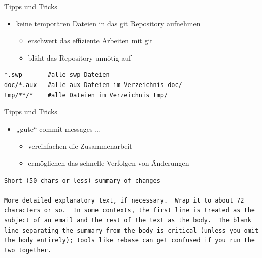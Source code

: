 \begin{frame}[fragile]{Tipps und Tricks}
  \begin{itemize}
    \item keine temporären Dateien in das git Repository aufnehmen
    \begin{itemize}
      \item erschwert das effiziente Arbeiten mit git
      \item bläht das Repository unnötig auf
    \end{itemize}
  \end{itemize}
  \lstset{frame=single}
  \begin{lstlisting}[caption=Inhalt der Datei .gitignore]
*.swp       #alle swp Dateien
doc/*.aux   #alle aux Dateien im Verzeichnis doc/
tmp/**/*    #alle Dateien im Verzeichnis tmp/
  \end{lstlisting}
\end{frame}

\begin{frame}[fragile]{Tipps und Tricks}
  \begin{itemize}
    \item „gute“ commit messages \ldots
    \begin{itemize}
      \item vereinfachen die Zusammenarbeit
      \item ermöglichen das schnelle Verfolgen von Änderungen
    \end{itemize}
  \end{itemize}
  \begin{lstlisting}[frame=single,caption={Quelle: \url{http://tbaggery.com/2008/04/19/a-note-about-git-commit-messages.html}}]
Short (50 chars or less) summary of changes

More detailed explanatory text, if necessary.  Wrap it to about 72
characters or so.  In some contexts, the first line is treated as the
subject of an email and the rest of the text as the body.  The blank
line separating the summary from the body is critical (unless you omit
the body entirely); tools like rebase can get confused if you run the
two together.
  \end{lstlisting}
\end{frame}

